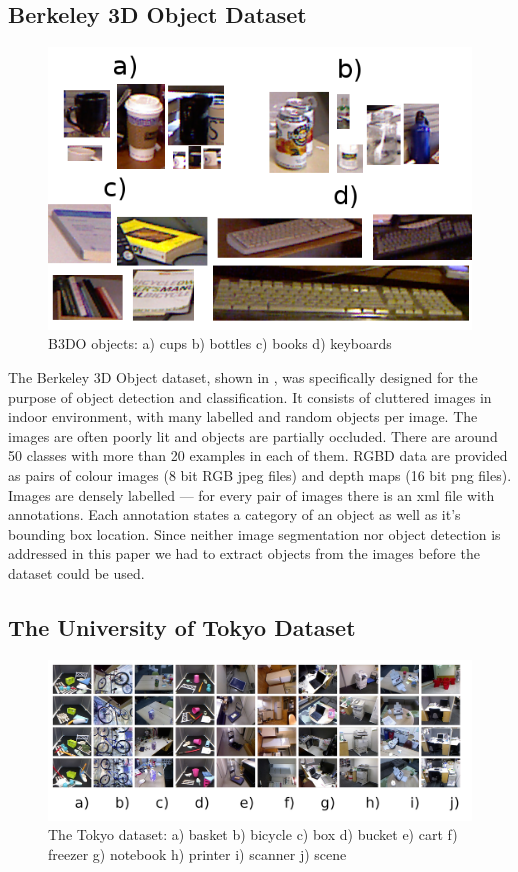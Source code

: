 \documentclass[11pt,twoside]{article}
\begin{document}
  \subsection{Berkeley 3D Object Dataset}
    \begin{figure}[!ht]
    \centering	
    \includegraphics[width=.75\textwidth]{../figs/b3do_objects}
    \caption{B3DO objects: a) cups b) bottles c) books d) keyboards}
    \label{fig:b3do_objects}
    \end{figure}    
    
    The Berkeley 3D Object dataset, shown in , was specifically designed for the purpose of object detection and classification. It consists of cluttered images in indoor environment, with many labelled and random objects per image. The images are often poorly lit and objects are partially occluded. There are around 50 classes with more than 20 examples in each of them. RGBD data are provided as pairs of colour images (8 bit RGB jpeg files) and depth maps (16 bit png files). Images are densely labelled --- for every pair of images there is an xml file with annotations. Each annotation states a category of an object as well as it's bounding box location. Since neither image segmentation nor object detection is addressed in this paper we had to extract objects from the images before the dataset could be used.

  \subsection{The University of Tokyo Dataset}	
    \begin{figure}[!ht]
    \centering
    \includegraphics[width=1\textwidth]{../figs/tokyo_horizontal}
    \caption{The Tokyo dataset: a) basket b) bicycle c) box d) bucket e) cart f) freezer g) notebook h) printer i) scanner j) scene}
    \label{fig:tokyo}
    \end{figure}
\end{document}
